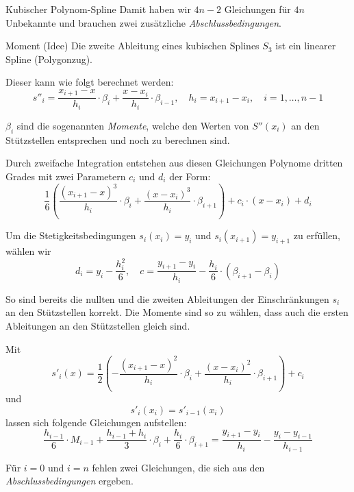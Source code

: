 \begin{defi}{Kubischer Polynom-Spline}
    Damit haben wir $4n-2$ Gleichungen für $4n$ Unbekannte und brauchen zwei zusätzliche \emph{Abschlussbedingungen}.
\end{defi}

\begin{bonus}{Moment (Idee)}
    Die zweite Ableitung eines kubischen Splines $S_3$ ist ein linearer Spline (Polygonzug). 
    
    Dieser kann wie folgt berechnet werden: 
    \[ 
        s''_i = \frac{x_{i+1} - x}{h_i} \cdot \beta_i + \frac{x - x_i}{h_i} \cdot \beta_{i-1}, \quad h_i = x_{i+1} - x_i, \quad i = 1, \ldots, n-1
    \]
    
    $\beta_i$ sind die sogenannten \emph{Momente}, welche den Werten von $S''(x_i)$ an den Stützstellen entsprechen und noch zu berechnen sind. 
    
    Durch zweifache Integration entstehen aus diesen Gleichungen Polynome dritten Grades mit zwei Parametern $c_i$ und $d_i$ der Form: 
    \[ 
        \frac{1}{6} \left( \frac{(x_{i+1} - x)^3}{h_i} \cdot \beta_i + \frac{(x - x_i)^3}{h_i} \cdot \beta_{i+1} \right) + c_i \cdot (x - x_i) + d_i
    \]
    
    Um die Stetigkeitsbedingungen $s_i(x_i) = y_i$ und $s_i(x_{i+1}) = y_{i+1}$ zu erfüllen, wählen wir
    \[
        d_i = y_i - \frac{h_i^2}{6}, \quad c = \frac{y_{i+1} - y_i}{h_i} - \frac{h_i}{6} \cdot (\beta_{i+1} - \beta_i)
    \]
    
    So sind bereits die nullten und die zweiten Ableitungen der Einschränkungen $s_i$ an den Stützstellen korrekt.
    Die Momente sind so zu wählen, dass auch die ersten Ableitungen an den Stützstellen gleich sind. 
    
    Mit
    \[ 
        s'_i(x) = \frac{1}{2} \left( - \frac{(x_{i+1} - x)^2}{h_i} \cdot \beta_i + \frac{(x - x_i)^2}{h_i} \cdot \beta_{i+1} \right) + c_i 
    \]
    und 
    \[ 
        s'_i(x_i) = s'_{i-1}(x_i)    
    \]
    lassen sich folgende Gleichungen aufstellen: 
    \[
        \frac{h_{i-1}}{6} \cdot M_{i-1} + \frac{h_{i-1}+h_{i}}{3} \cdot \beta_{i} + \frac{h_{i}}{6} \cdot \beta_{i+1} = \frac{y_{i+1}-y_{i}}{h_{i}} - \frac{y_{i}-y_{i-1}}{h_{i-1}}
    \]
    
    Für $i = 0$ und $i = n$ fehlen zwei Gleichungen, die sich aus den \emph{Abschlussbedingungen} ergeben.
    

\end{bonus}
